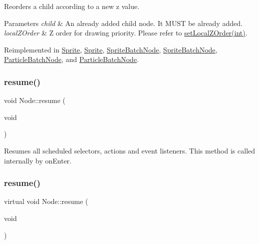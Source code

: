 Reorders a child according to a new z value.


\begin{DoxyParams}{Parameters}
{\em child} & An already added child node. It M\+U\+ST be already added. \\
\hline
{\em local\+Z\+Order} & Z order for drawing priority. Please refer to \hyperlink{classNode_aee4e616c2d55b722226aae1e68b4946f}{set\+Local\+Z\+Order(int)}. \\
\hline
\end{DoxyParams}


Reimplemented in \hyperlink{classSprite_a1b21c65760769e17477ae02ce75adf9f}{Sprite}, \hyperlink{classSprite_a128a1da95c110579928bdef1c3dacc78}{Sprite}, \hyperlink{classSpriteBatchNode_a8125810f4a9d5e1c4a4c82cd906baafd}{Sprite\+Batch\+Node}, \hyperlink{classSpriteBatchNode_a9f4e7d0be49a3c044424624ea283c301}{Sprite\+Batch\+Node}, \hyperlink{classParticleBatchNode_ab872c436a2cb7058f589aa7d16bcdd06}{Particle\+Batch\+Node}, and \hyperlink{classParticleBatchNode_a252befcd88cd095ab65809e94bb852ad}{Particle\+Batch\+Node}.

\mbox{\label{classNode_a7db2011610576bcba564fcf1f47c2e64}} 
\subsubsection{\texorpdfstring{resume()}{resume()}\hspace{0.1cm}{\footnotesize\ttfamily [1/2]}}
{\footnotesize\ttfamily void Node\+::resume (\begin{DoxyParamCaption}\item[{void}]{ }\end{DoxyParamCaption})\hspace{0.3cm}{\ttfamily [virtual]}}

Resumes all scheduled selectors, actions and event listeners. This method is called internally by on\+Enter. \mbox{\label{classNode_ab7915bc94d66dd198bc93c5034d454b0}} 
\subsubsection{\texorpdfstring{resume()}{resume()}\hspace{0.1cm}{\footnotesize\ttfamily [2/2]}}
{\footnotesize\ttfamily virtual void Node\+::resume (\begin{DoxyParamCaption}\item[{void}]{ }\end{DoxyParamCaption})\hspace{0.3cm}{\ttfamily [virtual]}}

